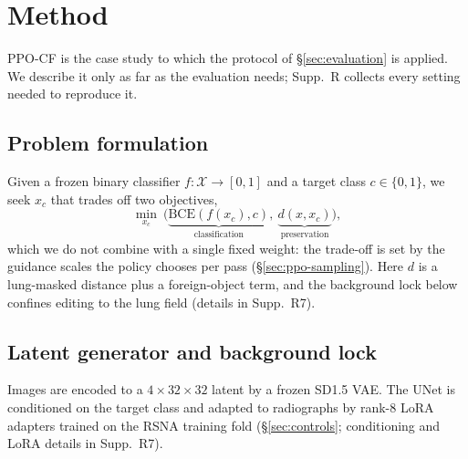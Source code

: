 \section{Method}
\label{sec:method}

PPO-CF is the case study to which the protocol of \S\ref{sec:evaluation} is applied. We describe it only as far as the evaluation needs; Supp.~R collects every setting needed to reproduce it.

\subsection{Problem formulation}
\label{sec:problem-formulation}

Given a frozen binary classifier $f: \mathcal{X} \to [0,1]$ and a target class $c \in \{0,1\}$, we seek $x_c$ that trades off two objectives,
\begin{equation}
\min_{x_c}\ \Big(\underbrace{\mathrm{BCE}(f(x_c), c)}_{\text{classification}},\ \underbrace{d(x, x_c)}_{\text{preservation}}\Big),
\label{eq:objective}
\end{equation}
which we do not combine with a single fixed weight: the trade-off is set by the guidance scales the policy chooses per pass (\S\ref{sec:ppo-sampling}). Here $d$ is a lung-masked distance plus a foreign-object term, and the background lock below confines editing to the lung field (details in Supp.~R7).

\subsection{Latent generator and background lock}
\label{sec:generator-lock}

Images are encoded to a $4\times32\times32$ latent by a frozen SD1.5 VAE. The UNet is conditioned on the target class and adapted to radiographs by rank-8 LoRA adapters trained on the RSNA training fold (\S\ref{sec:controls}; conditioning and LoRA details in Supp.~R7).

